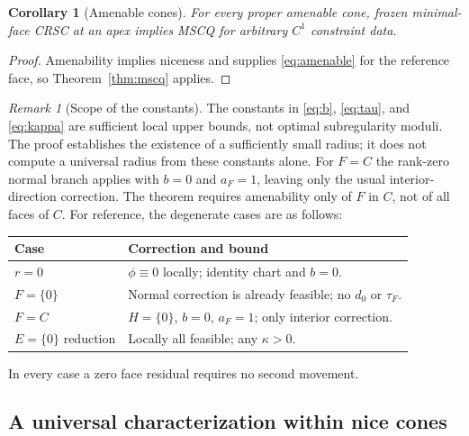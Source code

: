 \documentclass[11pt]{article}
\numberwithin{equation}{section}
\newtheorem{corollary}[theorem]{Corollary}
\theoremstyle{definition}
\theoremstyle{remark}
\newtheorem{remark}[theorem]{Remark}
\begin{document}
\begin{corollary}[Amenable cones]
\label{cor:amenable}
For every proper amenable cone, frozen minimal-face CRSC at an apex
implies MSCQ for arbitrary $C^1$ constraint data.
\end{corollary}
\begin{proof}
Amenability implies niceness and supplies \eqref{eq:amenable} for the
reference face, so Theorem~\ref{thm:mscq} applies.
\end{proof}

\begin{remark}[Scope of the constants]
The constants in \eqref{eq:b}, \eqref{eq:tau}, and \eqref{eq:kappa}
are sufficient local upper bounds, not optimal subregularity moduli.
The proof establishes the existence of a sufficiently small radius;
it does not compute a universal radius from these constants alone.
For $F=C$ the rank-zero normal branch applies with $b=0$ and $a_F=1$,
leaving only the usual interior-direction correction.
The theorem requires amenability only of $F$ in $C$, not of all faces of $C$.
For reference, the degenerate cases are as follows:
\begin{center}\small
\begin{tabular}{@{}ll@{}}
\toprule
Case & Correction and bound\\
\midrule
$r=0$ & $\phi\equiv0$ locally; identity chart and $b=0$.\\
$F=\{0\}$ & Normal correction is already feasible; no $d_0$ or $\tau_F$.\\
$F=C$ & $H=\{0\}$, $b=0$, $a_F=1$; only interior correction.\\
$E=\{0\}$ reduction & Locally all feasible; any $\kappa>0$.\\
\bottomrule
\end{tabular}
\end{center}
In every case a zero face residual requires no second movement.
\end{remark}

\subsection{A universal characterization within nice cones}
\end{document}
